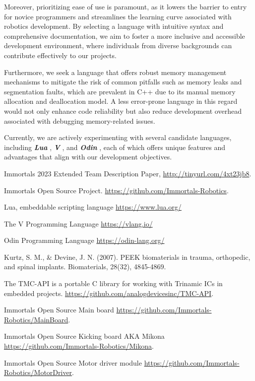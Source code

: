 \documentclass[runningheads]{llncs}
\begin{document}
Moreover, prioritizing ease of use is paramount, as it lowers the barrier to entry for novice programmers and streamlines the learning curve associated with robotics development. By selecting a language with intuitive syntax and comprehensive documentation, we aim to foster a more inclusive and accessible development environment, where individuals from diverse backgrounds can contribute effectively to our projects.

Furthermore, we seek a language that offers robust memory management mechanisms to mitigate the risk of common pitfalls such as memory leaks and segmentation faults, which are prevalent in C++ due to its manual memory allocation and deallocation model. A less error-prone language in this regard would not only enhance code reliability but also reduce development overhead associated with debugging memory-related issues.

Currently, we are actively experimenting with several candidate languages, including \textbf{\textit{Lua}} \cite{ref_3rd-lua}, \textbf{\textit{V}} \cite{ref_3rd-v-lang}, and \textbf{\textit{Odin}} \cite{ref_3rd-odin}, each of which offers unique features and advantages that align with our development objectives.

\newpage
\begin{thebibliography}{8}

Immortals 2023 Extended Team Description Paper, \url{http://tinyurl.com/4xt23jb8}.

Immortals Open Source Project. \url{https://github.com/Immortals-Robotics}.

Lua, embeddable scripting language \url{https://www.lua.org/}

The V Programming Language \url{https://vlang.io/}

Odin Programming Language \url{https://odin-lang.org/}

Kurtz, S. M., \& Devine, J. N. (2007). PEEK biomaterials in trauma, orthopedic, and spinal implants. Biomaterials, 28(32), 4845-4869.

The TMC-API is a portable C library for working with Trinamic ICs in embedded projects. \url{https://github.com/analogdevicesinc/TMC-API}.

Immortals Open Source Main board \url{https://github.com/Immortals-Robotics/MainBoard}.

Immortals Open Source Kicking board AKA Mikona \url{https://github.com/Immortals-Robotics/Mikona}.

Immortals Open Source Motor driver module \url{https://github.com/Immortals-Robotics/MotorDriver}.

\end{thebibliography}
\end{document}
